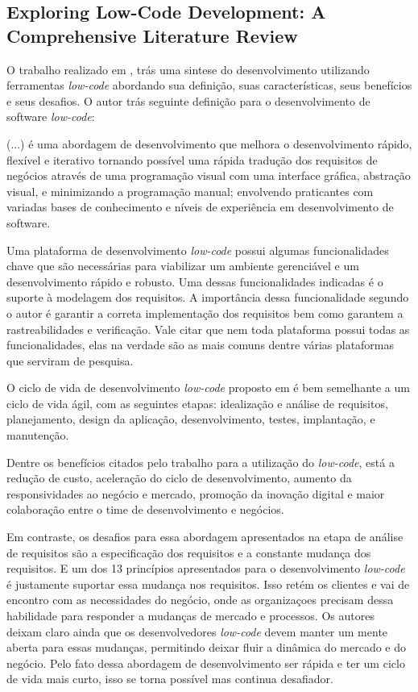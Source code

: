 		\subsection{Exploring Low-Code Development: A Comprehensive Literature Review}

		O trabalho realizado em \cite{LowCodeExploring}, trás uma sintese do desenvolvimento utilizando
		ferramentas \textit{low-code} abordando sua definição, suas características, seus benefícios e seus desafios.
		O autor trás seguinte definição para o desenvolvimento de software \textit{low-code}:

		\begin{quoting}
		\noindent (...) é uma abordagem de desenvolvimento que melhora o desenvolvimento rápido, flexível e iterativo tornando possível
		uma rápida tradução dos requisitos de negócios através de uma programação visual com uma interface gráfica, abstração visual, 
		e minimizando a programação manual; envolvendo praticantes com variadas bases de conhecimento e níveis de experiência em 
		desenvolvimento de software.
		\end{quoting}

		Uma plataforma de desenvolvimento \textit{low-code} possui algumas funcionalidades chave que são necessárias para viabilizar um 
		ambiente gerenciável e um desenvolvimento rápido e robusto. Uma dessas funcionalidades indicadas é o suporte à modelagem dos requisitos. A importância dessa funcionalidade segundo 
		o autor é garantir a correta implementação dos requisitos bem como garantem a rastreabilidades e verificação. Vale citar que nem toda plataforma possui todas as funcionalidades, elas na 
		verdade são as mais comuns dentre várias plataformas que serviram de pesquisa.

		O ciclo de vida de desenvolvimento \textit{low-code} proposto em \cite{LowCodeExploring} é bem semelhante a um ciclo de vida ágil, com as seguintes etapas: idealização e análise 
		de requisitos, planejamento, design da aplicação, desenvolvimento, testes, implantação, e manutenção.

		Dentre os benefícios citados pelo trabalho para a utilização do \textit{low-code}, está a redução de custo, aceleração do ciclo de desenvolvimento, aumento da responsividades 
		ao negócio e mercado, promoção da inovação digital e maior colaboração entre o time de desenvolvimento e negócios.

		Em contraste, os desafios para essa abordagem apresentados na etapa de análise de requisitos são a especificação dos requisitos e a constante mudança dos requisitos. E um dos 13 princípios 
		apresentados para o desenvolvimento \textit{low-code} é justamente suportar essa mudança nos requisitos. Isso retém os clientes e vai de encontro com as necessidades do negócio, 
		onde as organizaçoes precisam dessa habilidade para responder a mudanças de mercado e processos. Os autores deixam claro ainda que os desenvolvedores \textit{low-code} devem manter um mente aberta
		para essas mudanças, permitindo deixar fluir a dinâmica do mercado e do negócio. Pelo fato dessa abordagem de desenvolvimento ser rápida e ter um ciclo de vida mais curto, isso se torna possível 
		mas continua desafiador. 